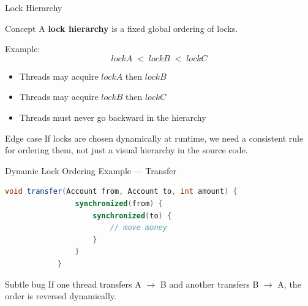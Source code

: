\documentclass[aspectratio=169,11pt]{beamer}
\begin{document}
	\begin{frame}{Lock Hierarchy}
		\begin{block}{Concept}
			A \textbf{lock hierarchy} is a fixed global ordering of locks.
		\end{block}
		
		\bigskip
		
		Example:
		\[
		lockA \;<\; lockB \;<\; lockC
		\]
		
		\bigskip
		
		\begin{itemize}
			\item Threads may acquire \(lockA\) then \(lockB\)
			\item Threads may acquire \(lockB\) then \(lockC\)
			\item Threads must never go backward in the hierarchy
		\end{itemize}
		
		\bigskip
		
		\begin{alertblock}{Edge case}
			If locks are chosen dynamically at runtime, we need a consistent rule
			for ordering them, not just a visual hierarchy in the source code.
		\end{alertblock}
	\end{frame}
	
	\begin{frame}[fragile]{Dynamic Lock Ordering Example --- Transfer}
		\begin{lstlisting}[language=Java]
			void transfer(Account from, Account to, int amount) {
				synchronized(from) {
					synchronized(to) {
						// move money
					}
				}
			}
		\end{lstlisting}
		
		\vspace{0.3cm}
		
		\begin{alertblock}{Subtle bug}
			If one thread transfers A \(\rightarrow\) B and another transfers B \(\rightarrow\) A,
			the order is reversed dynamically.
		\end{alertblock}
	\end{frame}
	
\end{document}
